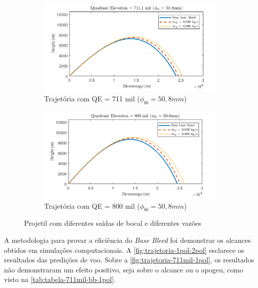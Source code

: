 \begin{figure}[!ht]
\begin{subfigure}[b]{0.47\textwidth}
    \end{subfigure}
    \hfill
    \begin{subfigure}[b]{0.47\textwidth}
        \centering
        \includegraphics[width=\textwidth]{trajetoria_thallyo_wallace_basebleed-foto3.png}
        \caption{Trajetória com QE = 711 mil ($\phi_{bb} = 50,8\unit{mm}$)}
        \label{fig:trajetoria-711mil-2pol}
    \end{subfigure}
    \hfill
    \begin{subfigure}[b]{0.47\textwidth}
        \centering
        \includegraphics[width=\textwidth]{trajetoria_thallyo_wallace_basebleed-foto4.png}
        \caption{Trajetória com QE = 800 mil ($\phi_{bb} = 50,8\unit{mm}$)}
        \label{fig:trajetoria-800mil-2pol}
    \end{subfigure}
	\caption{Projetil com diferentes saídas de bocal e diferentes vazões}
	\label{fig:trajetoria-1pol-2pol}
\end{figure}

A metodologia para provar a eficiência do \textit{Base Bleed} foi demonstrar os alcances obtidos em simulações computacionais. A \autoref{fig:trajetoria-1pol-2pol} esclarece os resultados das predições de voo. Sobre a \autoref{fig:trajetoria-711mil-1pol}, os resultados não demonstraram um efeito positivo, seja sobre o alcance ou o apogeu, como visto na \autoref{tab:tabela-711mil-bb-1pol}. 

